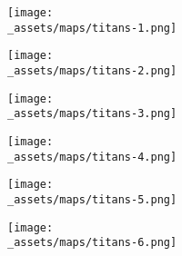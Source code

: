 \begin{minipage}{0.4\paperwidth}
  \centering
  \texttt{[image: \\\_assets/maps/titans-1.png]}
\end{minipage}
\begin{minipage}{0.4\paperwidth}
  \centering
  \texttt{[image: \\\_assets/maps/titans-2.png]}
\end{minipage}
\vspace{1em}
\linebreak
\begin{minipage}{0.4\paperwidth}
  \centering
  \texttt{[image: \\\_assets/maps/titans-3.png]}
\end{minipage}
\begin{minipage}{0.4\paperwidth}
  \centering
  \texttt{[image: \\\_assets/maps/titans-4.png]}
\end{minipage}
\vspace{1em}
\linebreak
\begin{minipage}{0.4\paperwidth}
  \centering
  \texttt{[image: \\\_assets/maps/titans-5.png]}
\end{minipage}
\begin{minipage}{0.4\paperwidth}
  \centering
  \texttt{[image: \\\_assets/maps/titans-6.png]}
\end{minipage}
